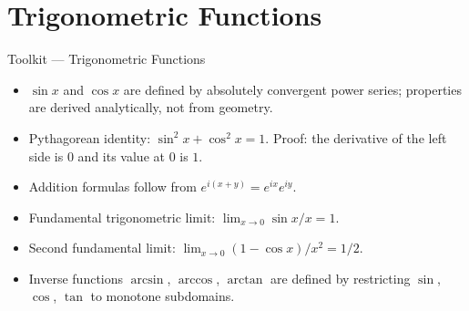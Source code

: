 \section{Trigonometric Functions}

\begin{toolkitbox}{Toolkit --- Trigonometric Functions}
\begin{itemize}
  \item $\sin x$ and $\cos x$ are defined by absolutely convergent
    power series; properties are derived analytically, not from
    geometry.
  \item Pythagorean identity: $\sin^2 x + \cos^2 x = 1$. Proof:
    the derivative of the left side is $0$ and its value at $0$
    is $1$.
  \item Addition formulas follow from $e^{i(x+y)} = e^{ix}e^{iy}$.
  \item Fundamental trigonometric limit: $\lim_{x \to 0}\sin x/x = 1$.
  \item Second fundamental limit: $\lim_{x\to 0}(1-\cos x)/x^2 = 1/2$.
  \item Inverse functions $\arcsin$, $\arccos$, $\arctan$ are defined
    by restricting $\sin$, $\cos$, $\tan$ to monotone subdomains.
\end{itemize}
\end{toolkitbox}


